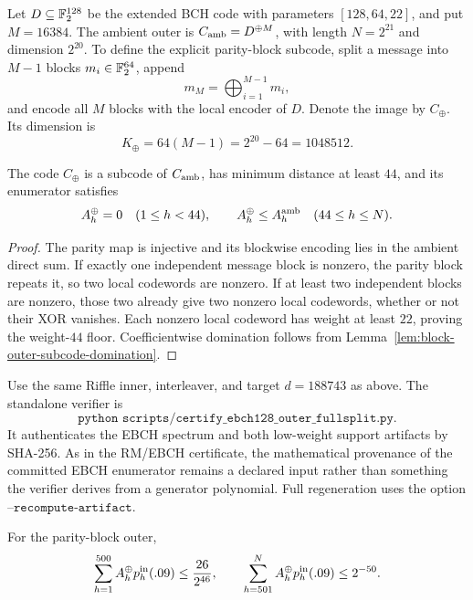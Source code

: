 Let \(D\subseteq\mathbb{F}_2^{128}\) be the extended BCH code with parameters
\([128,64,22]\), and put \(M=16384\).  The ambient outer is
\(C_{\rm amb}=D^{\oplus M}\), with length \(N=2^{21}\) and dimension
\(2^{20}\).  To define the explicit parity-block subcode, split a message into
\(M-1\) blocks \(m_i\in\mathbb{F}_2^{64}\), append
\[
 m_M=\bigoplus_{i=1}^{M-1}m_i,
\]
and encode all \(M\) blocks with the local encoder of \(D\).  Denote the image
by \(C_{\oplus}\).  Its dimension is
\[
 K_{\oplus}=64(M-1)=2^{20}-64=1048512.
\]

\begin{lemma}
\label{lem:ebch-xor-parity-floor}
The code \(C_{\oplus}\) is a subcode of \(C_{\rm amb}\), has minimum distance
at least \(44\), and its enumerator satisfies
\[
 A_h^{\oplus}=0\quad(1\le h<44),\qquad
 A_h^{\oplus}\le A_h^{\rm amb}\quad(44\le h\le N).
\]
\end{lemma}

\begin{proof}
The parity map is injective and its blockwise encoding lies in the ambient
direct sum.  If exactly one independent message block is nonzero, the parity
block repeats it, so two local codewords are nonzero.  If at least two
independent blocks are nonzero, those two already give two nonzero local
codewords, whether or not their XOR vanishes.  Each nonzero local codeword has
weight at least \(22\), proving the weight-\(44\) floor.  Coefficientwise
domination follows from Lemma~\ref{lem:block-outer-subcode-domination}.
\end{proof}

Use the same Riffle inner, interleaver, and target
\(d=188743\) as above.  The standalone verifier is
\[
 \texttt{python scripts/certify\_ebch128\_outer\_fullsplit.py}.
\]
It authenticates the EBCH spectrum and both low-weight support artifacts by
SHA-256.  As in the RM/EBCH certificate, the mathematical provenance of the
committed EBCH enumerator remains a declared input rather than something the
verifier derives from a generator polynomial.  Full regeneration uses the option
\(\texttt{--recompute-artifact}\).

\begin{lemma}
\label{lem:ebch-xor-parity-rational}
For the parity-block outer,
\[
 \sum_{h=1}^{500}A_h^{\oplus}p_h^{\rm in}(.09)
 \le \frac{26}{2^{46}},\qquad
 \sum_{h=501}^{N}A_h^{\oplus}p_h^{\rm in}(.09)
 \le 2^{-50}.
\]
\end{lemma}

